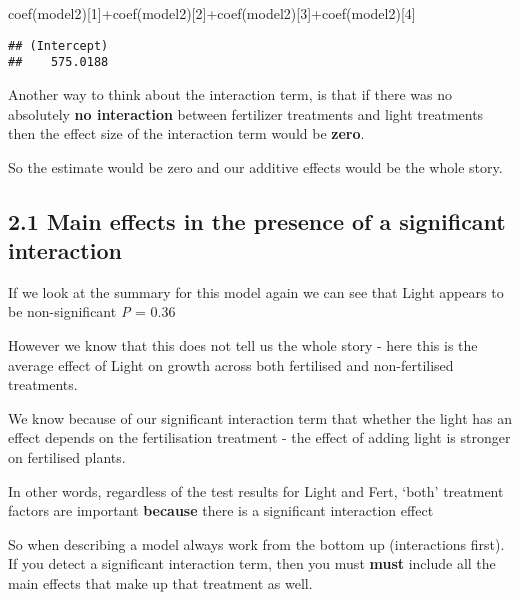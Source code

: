 \documentclass[
]{article}
\newenvironment{Shaded}{\begin{snugshade}}{\end{snugshade}}
\newcommand{\DecValTok}[1]{\textcolor[rgb]{0.00,0.00,0.81}{#1}}
\newcommand{\FunctionTok}[1]{\textcolor[rgb]{0.00,0.00,0.00}{#1}}
\newcommand{\NormalTok}[1]{#1}
\newcommand{\SpecialCharTok}[1]{\textcolor[rgb]{0.00,0.00,0.00}{#1}}
\begin{document}
\begin{Shaded}
\begin{Highlighting}[]
\FunctionTok{coef}\NormalTok{(model2)[}\DecValTok{1}\NormalTok{]}\SpecialCharTok{+}\FunctionTok{coef}\NormalTok{(model2)[}\DecValTok{2}\NormalTok{]}\SpecialCharTok{+}\FunctionTok{coef}\NormalTok{(model2)[}\DecValTok{3}\NormalTok{]}\SpecialCharTok{+}\FunctionTok{coef}\NormalTok{(model2)[}\DecValTok{4}\NormalTok{]}
\end{Highlighting}
\end{Shaded}

\begin{verbatim}
## (Intercept) 
##    575.0188
\end{verbatim}

Another way to think about the interaction term, is that if there was no
absolutely \textbf{no interaction} between fertilizer treatments and
light treatments then the effect size of the interaction term would be
\textbf{zero}.

So the estimate would be zero and our additive effects would be the
whole story.

\hypertarget{main-effects-in-the-presence-of-a-significant-interaction}{%
\subsection{2.1 Main effects in the presence of a significant
interaction}\label{main-effects-in-the-presence-of-a-significant-interaction}}

If we look at the summary for this model again we can see that Light
appears to be non-significant \emph{P} = 0.36

However we know that this does not tell us the whole story - here this
is the average effect of Light on growth across both fertilised and
non-fertilised treatments.

We know because of our significant interaction term that whether the
light has an effect depends on the fertilisation treatment - the effect
of adding light is stronger on fertilised plants.

In other words, regardless of the test results for Light and Fert,
`both' treatment factors are important \textbf{because} there is a
significant interaction effect

So when describing a model always work from the bottom up (interactions
first). If you detect a significant interaction term, then you must
\textbf{must} include all the main effects that make up that treatment
as well.
\end{document}
